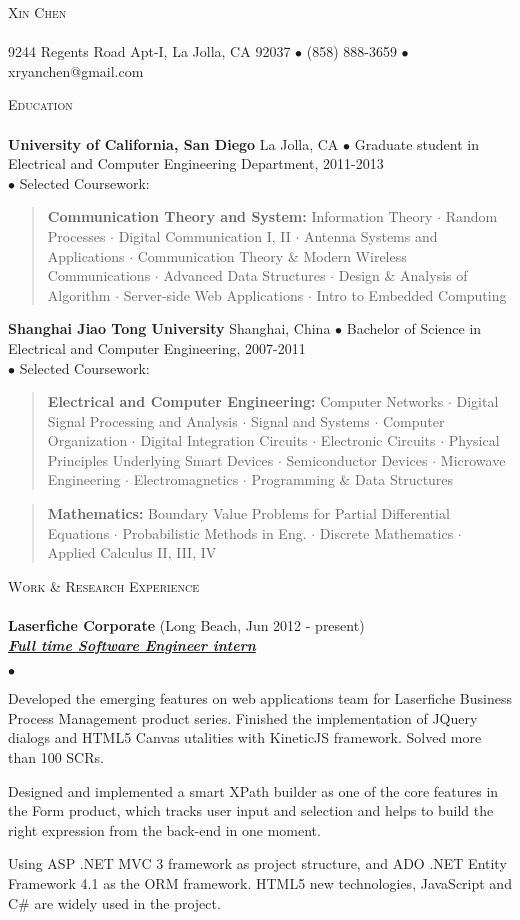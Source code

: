 \documentclass{article}
\newcommand{\area}[2]{\vspace*{-9pt} \begin{verse}\textbf{#1}   #2 \end{verse}  }
\newcommand{\lineunder}{\vspace*{-8pt} \\ \hspace*{-18pt} \hrulefill \\}
\newcommand{\header}[1]{{\hspace*{-15pt}\vspace*{6pt} \textsc{#1}} \vspace*{-6pt} \lineunder}
\newcommand{\employer}[3]{{ \textbf{#1} (#2)\\ \underline{\textbf{\emph{#3}}}\\  }}
\newcommand{\contact}[2]{
\vspace*{-8pt}
\begin{center}
{\LARGE \scshape {#1}}
\lineunder 
#2
\end{center}
\vspace*{-8pt}
}
\newenvironment{achievements}{\begin{list}{$\bullet$}{\topsep 0pt \itemsep -2pt}}{\vspace*{4pt}\end{list}}
\newcommand{\schoolwithcourses}[4]{
 \textbf{#1} #2 $\bullet$ #3\\ 
#4\\
\vspace*{5pt}
}
\begin{document}
\small
\smallskip
\vspace*{-95pt}

\contact{Xin Chen}
{9244 Regents Road Apt-I, La Jolla, CA 92037 $\bullet$ (858) 888-3659 $\bullet$ xryanchen@gmail.com}

\header{Education}

\schoolwithcourses{University of California, San Diego}{La Jolla, CA}{Graduate student in Electrical and Computer Engineering Department, 2011-2013}
{$\bullet$ Selected Coursework:}
	\area{Communication Theory and System:}{ Information Theory $\cdot$ Random Processes $\cdot$ Digital Communication I, II $\cdot$ Antenna Systems and Applications $\cdot$ Communication Theory \& Modern Wireless Communications $\cdot$ Advanced Data Structures $\cdot$ Design \& Analysis of Algorithm $\cdot$ Server-side Web Applications $\cdot$ Intro to Embedded Computing}

\schoolwithcourses{Shanghai Jiao Tong University}{Shanghai, China}{Bachelor of Science in Electrical and Computer Engineering, 2007-2011}
{$\bullet$ Selected Coursework:}
	\area{Electrical and Computer Engineering:}{ Computer Networks $\cdot$ Digital Signal Processing and Analysis 
	      $\cdot$ Signal and Systems $\cdot$ Computer Organization $\cdot$ Digital Integration Circuits $\cdot$ Electronic Circuits $\cdot$ 
	      Physical Principles Underlying Smart Devices $\cdot$ Semiconductor Devices $\cdot$ Microwave Engineering 
	      $\cdot$ Electromagnetics $\cdot$ Programming \& Data Structures }
	\area{Mathematics:}{ Boundary Value Problems for Partial Differential Equations $\cdot$ Probabilistic Methods in Eng. 
	      $\cdot$ Discrete Mathematics $\cdot$ Applied Calculus II, III, IV}

\header{Work \& Research Experience}
\employer{Laserfiche Corporate}{Long Beach, Jun 2012 - present}{Full time Software Engineer intern}
	\begin{achievements}
	\item Developed the emerging features on web applications team for Laserfiche Business Process Management product series. Finished the implementation of JQuery dialogs and HTML5 Canvas utalities with KineticJS framework. Solved more than 100 SCRs.
	\item Designed and implemented a smart XPath builder as one of the core features in the Form product, which tracks user input and selection and helps to build the right expression from the back-end in one moment. 
	\item Using ASP .NET MVC 3 framework as project structure, and ADO .NET Entity Framework 4.1 as the ORM framework. HTML5 new technologies, JavaScript and C\# are widely used in the project.
	\end{achievements}
\end{document}
